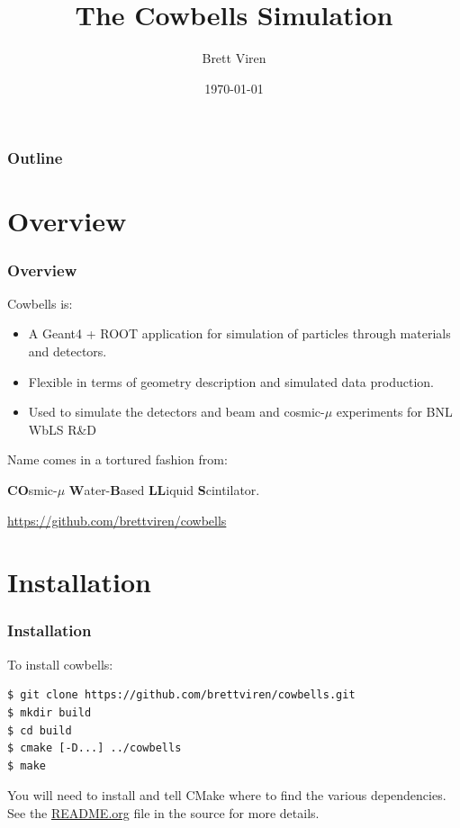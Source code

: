 \documentclass[xcolor=dvipsnames]{beamer}
\title[cowbells]{The Cowbells Simulation}
\institute[BNL]
{
  Physics Department
  
  \texttt{[image: bnl-logo]}
}
\author{Brett Viren}
\date{\today}
\begin{document}
\begin{frame}
\titlepage
\end{frame}

\begin{frame}
  \frametitle{Outline}

  \tableofcontents
\end{frame}

\section{Overview}

\begin{frame}
  \frametitle{Overview}
  
  Cowbells is:
  \begin{itemize}
  \item A Geant4 + ROOT application for simulation of particles through materials and detectors.
  \item Flexible in terms of geometry description and simulated data production.
  \item Used to simulate the detectors and beam and cosmic-$\mu$ experiments for BNL WbLS R\&D
  \end{itemize}

  Name comes in a tortured fashion from: 

  \begin{center}
    \textbf{CO}smic-$\mu$ \textbf{W}ater-\textbf{B}ased \textbf{LL}iquid \textbf{S}cintilator.
  \end{center}
  
  \begin{center}
    \url{https://github.com/brettviren/cowbells}
  \end{center}

\end{frame}

\section{Installation}

\begin{frame}[fragile]
  \frametitle{Installation}
  To install cowbells:

  \begin{lstlisting}[langauge=sh]
$ git clone https://github.com/brettviren/cowbells.git
$ mkdir build
$ cd build
$ cmake [-D...] ../cowbells
$ make
  \end{lstlisting}

  You will need to install and tell CMake where to find the various
  dependencies.  See the \href{https://github.com/brettviren/cowbells/blob/master/README.org}{README.org} file in the source for
  more details.

\end{frame}
\end{document}
